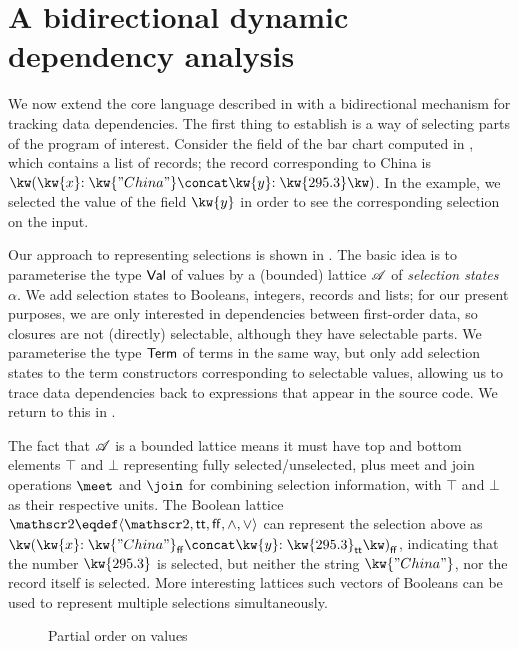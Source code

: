 \section{A bidirectional dynamic dependency analysis}
\label{sec:data-dependencies}

We now extend the core language described in  with a bidirectional mechanism for tracking data dependencies. The first thing to establish is a way of selecting parts of the program of interest. Consider the  field of the bar chart computed in , which contains a list of records; the record corresponding to China is $\exRec{\bind{\kw{x}}{\kw{"China"}} \concat \bind{\kw{y}}{\kw{295.3}}}$. In the example, we selected the value of the field $\kw{y}$ in order to see the corresponding selection on the input.

Our approach to representing selections is shown in . The basic idea is to parameterise the type $\textup{\textsf{Val}}$ of values by a (bounded) lattice $\mathscr{A}$ of \emph{selection states} $\alpha$. We add selection states to Booleans, integers, records and lists; for our present purposes, we are only interested in dependencies between first-order data, so closures are not (directly) selectable, although they have selectable parts. We parameterise the type $\textup{\textsf{Term}}$ of terms in the same way, but only add selection states to the term constructors corresponding to selectable values, allowing us to trace data dependencies back to expressions that appear in the source code. We return to this in .



The fact that $\mathscr{A}$ is a bounded lattice means it must have top and bottom elements $\top$ and $\bot$ representing fully selected/unselected, plus meet and join operations $\meet$ and $\join$ for combining selection information, with $\top$ and $\bot$ as their respective units. The Boolean lattice $\Bool \eqdef \Lattice{\Bool}{\TT}{\FF}{\wedge}{\vee}$ can represent the selection above as $\annRec{\bind{\kw{x}}{\annStr{\kw{"China"}}{\FF}} \concat \bind{\kw{y}}{\annInt{\kw{295.3}}{\TT}}}{\FF}$, indicating that the number $\exInt{\kw{295.3}}$ is selected, but neither the string $\exStr{\kw{"China"}}$, nor the record itself is selected. More interesting lattices such vectors of Booleans can be used to represent multiple selections simultaneously.

\begin{figure}
   
   \caption{Partial order on values}
   \label{fig:data-dependencies:leq}
\end{figure}



